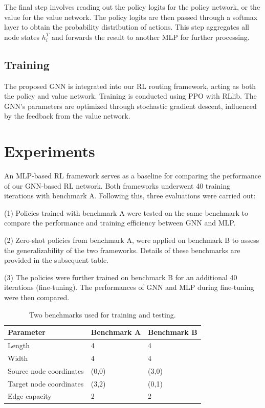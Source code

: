 \documentclass[letterpaper]{article}
\begin{document}
The final step involves reading out the policy logits for the policy network, or the value for the value network. The policy logits are then passed through a softmax layer to obtain the probability distribution of actions. This step aggregates all node states \(h_i^T\) and forwards the result to another MLP for further processing.


\subsection{Training}
The proposed GNN is integrated into our RL routing framework, acting as both the policy and value network. Training is conducted using PPO \cite{Schulman2017} with RLlib. The GNN's parameters are optimized through stochastic gradient descent, influenced by the feedback from the value network.

\section{Experiments}
An MLP-based RL framework serves as a baseline for comparing the performance of our GNN-based RL network. Both frameworks underwent 40 training iterations with benchmark A. Following this, three evaluations were carried out:

(1) Policies trained with benchmark A were tested on the same benchmark to compare the performance and training efficiency between GNN and MLP.

(2) Zero-shot policies from benchmark A, were applied on benchmark B to assess the generalizability of the two frameworks. Details of these benchmarks are provided in the subsequent table.

(3) The policies were further trained on benchmark B for an additional 40 iterations (fine-tuning). The performances of GNN and MLP during fine-tuning were then compared.

\begin{table}[h!]
    \caption{Two benchmarks used for training and testing.}
    \centering
    \begin{tabularx}{\textwidth}{LLL}
        \toprule
        Parameter & Benchmark A & Benchmark B \\
        \midrule
        Length & 4 & 4 \\
        Width & 4 & 4 \\
        Source node coordinates & (0,0) & (3,0) \\
        Target node coordinates & (3,2) & (0,1) \\
        Edge capacity & 2 & 2 \\
        \bottomrule
    \end{tabularx}
\end{table}
\end{document}
